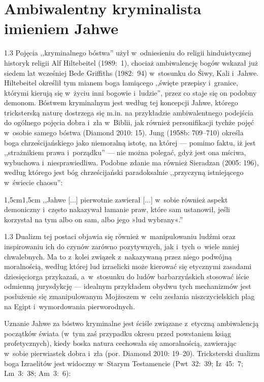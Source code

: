 \documentclass[11pt,a4paper,twoside]{report}
\begin{document}
\chapter{Ambiwalentny kryminalista imieniem Jahwe}
\begin{spacing}{1.3}
Pojęcia ,,kryminalnego bóstwa'' użył w~odniesieniu do religii hinduistycznej historyk religii Alf Hiltebeitel (1989:~1), chociaż ambiwalencję bogów wskazał już siedem lat wcześniej Bede Griffiths (1982:~94) w~stosunku do Śiwy, Kali i~Jahwe. Hiltebeitel określił tym mianem boga łamiącego ,,święte przepisy i~granice, którymi kierują się w~życiu inni bogowie i~ludzie'', przez co staje się on podobny demonom. Bóstwem kryminalnym jest według tej koncepcji Jahwe, którego tricksterską naturę dostrzega się m.in. na przykładzie ambiwalentnego podejścia do ogólnego pojęcia dobra i~zła w~Biblii, jak również personifikacji tychże pojęć w~osobie samego bóstwa (Diamond 2010: 15). Jung (1958b: 709--710) określa boga chrześcijańskiego jako niemoralną istotę, na której --- pomimo faktu, iż jest ,,strażnikiem prawa i~porządku'' --- nie można polegać, gdyż jest ona mściwa, wybuchowa i~niesprawiedliwa. Podobne zdanie ma również Sieradzan (2005: 196), według którego jest bóg chrześcijański paradoksalnie ,,przyczyną istniejącego w~świecie chaosu'':
\end{spacing}

\begin{adjustwidth}{1,5cm}{1,5cm}
\small{
,,Jahwe [...] pierwotnie zawierał [...] w~sobie również aspekt demoniczny i~często nakazywał łamanie praw, które sam ustanowił, jeśli korzystał na tym albo on sam, albo jego »lud wybrany«.''\\
}
\end{adjustwidth}

\begin{spacing}{1.3}
Dualizm tej postaci objawia się również w~manipulowaniu ludźmi oraz inspirowaniu ich do czynów zarówno pozytywnych, jak i~tych o~wiele mniej chwalebnych. Ma to z~kolei związek z~nakazywaną przez niego podwójną moralnością, według której lud izraelicki może kierować się etycznymi zasadami dziesięciorga przykazań, a~w~stosunku do ludów barbarzyńskich stosować iście odmienną jurysdykcję --- idealnym przykładem obydwu tych mechanizmów jest posłużenie się zmanipulowanym Mojżeszem w~celu zesłania niszczycielskich plag na Egipt i~wymordowania pierworodnych.

Uznanie Jahwe za bóstwo kryminalne jest ściśle związane z~etyczną ambiwalencją początków świata (w~tym zaś przypadku okresu przed powstaniem ksiąg profetycznych), kiedy boska natura cechowała się amoralnością, zawierając w~sobie pierwiastek dobra i~zła (por. Diamond 2010: 19--20). Tricksterski dualizm boga Izraelitów jest widoczny w~Starym Testamencie (Pwt~32:~39; Iz~45:~7; Lm~3:~38; Am~3:~6):
\end{spacing}
\end{document}
